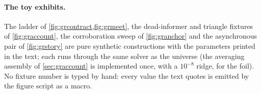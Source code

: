 \paragraph{The toy exhibits.}
The ladder of \cref{fig:grcontract,fig:grmeet}, the dead-informer and
triangle fixtures of \cref{fig:graccount}, the corroboration sweep of
\cref{fig:granchor} and the asynchronous pair of \cref{fig:grstory}
are pure synthetic constructions with the parameters printed in the
text; each runs through the same solver as the universe (the
averaging assembly of \cref{sec:graccount} is implemented once,
with a $10^{-8}$ ridge, for the foil).  No fixture number is typed by
hand: every value the text quotes is emitted by the figure script as
a macro.
